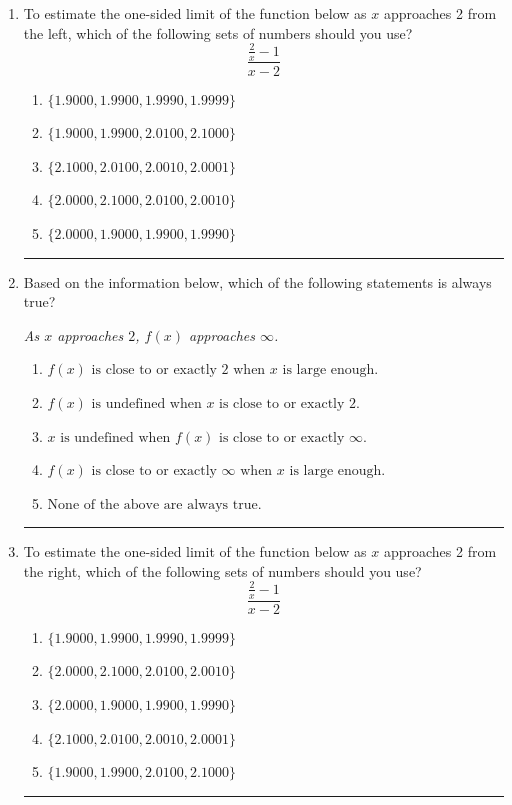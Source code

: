 \documentclass[14pt]{extbook}
\newcommand{\litem}[1]{\item#1\hspace*{-1cm}\rule{\textwidth}{0.4pt}}
\begin{document}
\begin{enumerate}
\litem{
To estimate the one-sided limit of the function below as $x$ approaches 2 from the left, which of the following sets of numbers should you use?\[ \frac{\frac{2}{x} - 1}{x - 2} \]\begin{enumerate}[label=\Alph*.]
\item \( \{ 1.9000, 1.9900, 1.9990, 1.9999 \} \)
\item \( \{ 1.9000, 1.9900, 2.0100, 2.1000 \} \)
\item \( \{ 2.1000, 2.0100, 2.0010, 2.0001 \} \)
\item \( \{ 2.0000, 2.1000, 2.0100, 2.0010 \} \)
\item \( \{ 2.0000, 1.9000, 1.9900, 1.9990 \} \)

\end{enumerate} }
\litem{
Based on the information below, which of the following statements is always true?
\begin{center}
    \textit{ As $x$ approaches $2$, $f(x)$ approaches $\infty$. }
\end{center}
\begin{enumerate}[label=\Alph*.]
\item \( f(x) \text{ is close to or exactly } 2 \text{ when } x \text{ is large enough}. \)
\item \( f(x) \text{ is undefined when } x \text{ is close to or exactly } 2. \)
\item \( x \text{ is undefined when } f(x) \text{ is close to or exactly } \infty. \)
\item \( f(x) \text{ is close to or exactly } \infty \text{ when } x \text{ is large enough}. \)
\item \( \text{None of the above are always true.} \)

\end{enumerate} }
\litem{
To estimate the one-sided limit of the function below as $x$ approaches 2 from the right, which of the following sets of numbers should you use?\[ \frac{\frac{2}{x} - 1}{x - 2} \]\begin{enumerate}[label=\Alph*.]
\item \( \{ 1.9000, 1.9900, 1.9990, 1.9999 \} \)
\item \( \{ 2.0000, 2.1000, 2.0100, 2.0010 \} \)
\item \( \{ 2.0000, 1.9000, 1.9900, 1.9990 \} \)
\item \( \{ 2.1000, 2.0100, 2.0010, 2.0001 \} \)
\item \( \{ 1.9000, 1.9900, 2.0100, 2.1000 \} \)


\end{enumerate}}
\end{enumerate}
\end{document}
